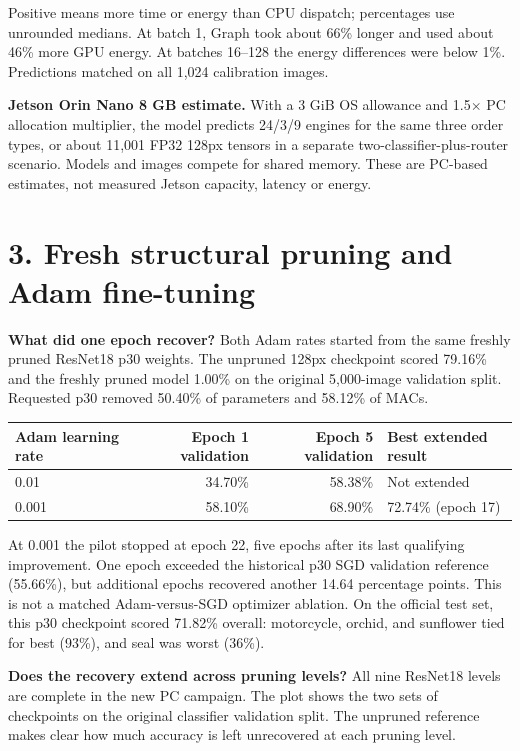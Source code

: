 \documentclass[10pt,a4paper]{article}
\newcommand{\heading}[1]{\section*{\color{navy}#1}}
\newcommand{\smallcap}[1]{{\footnotesize\color{navy}#1}\par}
\begin{document}
\smallcap{Positive means more time or energy than CPU dispatch; percentages use unrounded medians. At batch 1, Graph took about 66\% longer and used about 46\% more GPU energy. At batches 16--128 the energy differences were below 1\%. Predictions matched on all 1,024 calibration images.}

\textbf{Jetson Orin Nano 8 GB estimate.} With a 3 GiB OS allowance and 1.5$\times$ PC allocation multiplier, the model predicts 24/3/9 engines for the same three order types, or about 11,001 FP32 128px tensors in a separate two-classifier-plus-router scenario. Models and images compete for shared memory. These are PC-based estimates, not measured Jetson capacity, latency or energy.

\newpage
\heading{3. Fresh structural pruning and Adam fine-tuning}
\textbf{What did one epoch recover?} Both Adam rates started from the same freshly pruned ResNet18 p30 weights. The unpruned 128px checkpoint scored 79.16\% and the freshly pruned model 1.00\% on the original 5,000-image validation split. Requested p30 removed 50.40\% of parameters and 58.12\% of MACs.

\begin{center}\small
\begin{tabular}{@{}lrrl@{}}\toprule
Adam learning rate & Epoch 1 validation & Epoch 5 validation & Best extended result\\
\midrule
0.01 & 34.70\% & 58.38\% & Not extended\\
0.001 & 58.10\% & 68.90\% & 72.74\% (epoch 17)\\
\bottomrule\end{tabular}
\end{center}
At 0.001 the pilot stopped at epoch 22, five epochs after its last qualifying improvement. One epoch exceeded the historical p30 SGD validation reference (55.66\%), but additional epochs recovered another 14.64 percentage points. This is not a matched Adam-versus-SGD optimizer ablation. On the official test set, this p30 checkpoint scored 71.82\% overall: motorcycle, orchid, and sunflower tied for best (93\%), and seal was worst (36\%).

\textbf{Does the recovery extend across pruning levels?} All nine ResNet18 levels are complete in the new PC campaign. The plot shows the two sets of checkpoints on the original classifier validation split. The unpruned reference makes clear how much accuracy is left unrecovered at each pruning level.
\end{document}
